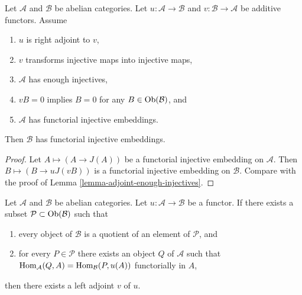 \begin{lemma}
\label{lemma-adjoint-functorial-injectives}
Let $\mathcal{A}$ and $\mathcal{B}$ be abelian categories.
Let $u : \mathcal{A} \to \mathcal{B}$ and
$v : \mathcal{B} \to \mathcal{A}$ be additive functors.
Assume
\begin{enumerate}
\item $u$ is right adjoint to $v$,
\item $v$ transforms injective maps into injective maps,
\item $\mathcal{A}$ has enough injectives,
\item $vB = 0$ implies $B = 0$ for any $B \in \mathop{\mathrm{Ob}}\nolimits(\mathcal{B})$, and
\item $\mathcal{A}$ has functorial injective embeddings.
\end{enumerate}
Then $\mathcal{B}$ has functorial injective embeddings.
\end{lemma}

\begin{proof}
Let $A \mapsto (A \to J(A))$ be a functorial
injective embedding on $\mathcal{A}$. Then
$B \mapsto (B \to uJ(vB))$ is a functorial
injective embedding on $\mathcal{B}$. Compare with the
proof of Lemma \ref{lemma-adjoint-enough-injectives}.
\end{proof}

\begin{lemma}
\label{lemma-partially-defined-adjoint}
Let $\mathcal{A}$ and $\mathcal{B}$ be abelian categories.
Let $u : \mathcal{A} \to \mathcal{B}$ be a functor.
If there exists a subset $\mathcal{P} \subset \mathop{\mathrm{Ob}}\nolimits(\mathcal{B})$
such that
\begin{enumerate}
\item every object of $\mathcal{B}$ is a quotient of an element
of $\mathcal{P}$, and
\item for every $P \in \mathcal{P}$ there exists an object
$Q$ of $\mathcal{A}$ such that
$\mathop{\mathrm{Hom}}\nolimits_\mathcal{A}(Q, A) = \mathop{\mathrm{Hom}}\nolimits_\mathcal{B}(P, u(A))$ functorially
in $A$,
\end{enumerate}
then there exists a left adjoint $v$ of $u$.
\end{lemma}

